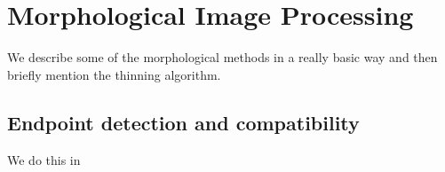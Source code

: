 \chapter{Morphological Image Processing}
We describe some of the morphological methods in a really basic way and then briefly mention the thinning algorithm.


\section{}
\section{Endpoint detection and compatibility}
We do this in 